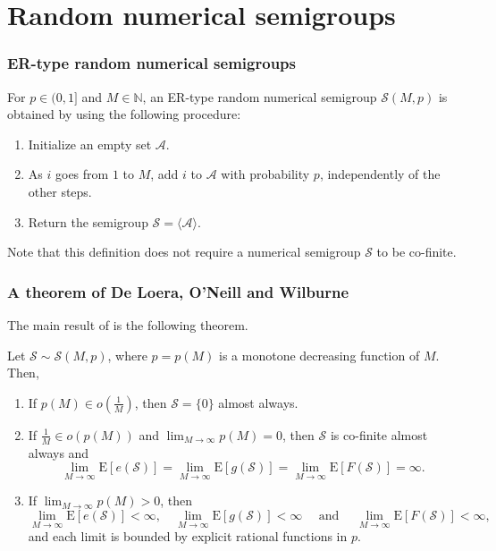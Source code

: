 \documentclass{beamer}
\def\NN{\ensuremath{\mathbb{N}}}
\def\EE{\ensuremath{\mathrm{E}}}
\begin{document}
\section{Random numerical semigroups}

\begin{frame}
    \frametitle{ER-type random numerical semigroups}
    \begin{definition}\label{def:randnumsems:ermodel}
        For $p \in (0, 1]$ and $M \in \NN$, an ER-type random numerical semigroup $\mathcal{S}(M, p)$ is obtained by using the following procedure:
        \begin{enumerate}
            \item Initialize an empty set $\mathcal{A}$.
            \item As $i$ goes from $1$ to $M$, add $i$ to $\mathcal{A}$ with probability $p$, independently of the other steps.
            \item Return the semigroup $\mathcal{S} = \langle\mathcal{A}\rangle$.
        \end{enumerate}
    \end{definition}
    Note that this definition does not require a numerical semigroup $\mathcal{S}$ to be co-finite.
\end{frame}

\begin{frame}
    \frametitle{A theorem of De Loera, O'Neill and Wilburne}
    The main result of \cite{de2018random} is the following theorem.  
    \fontsize{8pt}{7.2}\selectfont

\begin{theorem}\label{thm:ermodel} Let $\mathcal{S} \sim \mathcal{S}(M, p)$, where $p = p(M)$ is a monotone decreasing function of $M$. Then, 
    \begin{enumerate}
        \item If $p(M) \in o\left(\frac{1}{M}\right)$, then $\mathcal{S} = \{0\}$ almost always.
        \item If $\frac{1}{M} \in o(p(M))$ and $\lim_{M \to \infty} p(M)= 0$, then $\mathcal{S}$ is co-finite almost always and
         \[\lim_{M \to  \infty} \EE[e(\mathcal{S})] = \lim_{M \to \infty} \EE[g(\mathcal{S})] = \lim_{M \to \infty} \EE[F(\mathcal{S})] = \infty.\]
        \item If $\lim_{M \to \infty} p(M) > 0$, then
        \[\lim_{M \to \infty} \EE[e(\mathcal{S})] < \infty,  \quad \lim_{M \to \infty} \EE[g(\mathcal{S})] < \infty \quad  \text{ and } \quad \lim_{M \to \infty} \EE[F(\mathcal{S})]< \infty,\]
        and each limit is bounded by explicit rational functions in $p$.
    \end{enumerate}
\end{theorem}
\end{frame}
\end{document}
